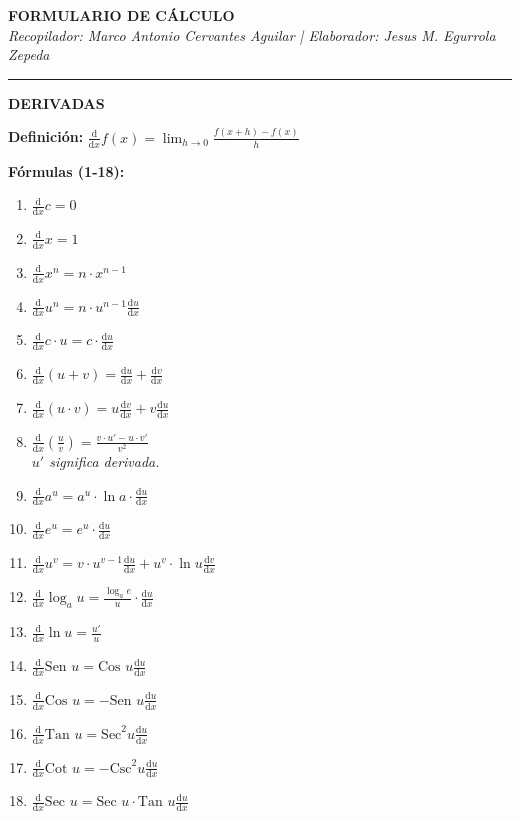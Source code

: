 \documentclass[10pt, letterpaper, landscape]{article}
\newcommand{\dd}{\mathrm{d}}
\newcommand{\deriv}[2]{\frac{\dd#1}{\dd#2}}
\begin{document}
\begin{center}
    {\large \textbf{FORMULARIO DE CÁLCULO}} \\
    \footnotesize \textit{Recopilador: Marco Antonio Cervantes Aguilar | Elaborador: Jesus M. Egurrola Zepeda}
\end{center}
\vspace{-0.3cm}
\hrule
\vspace{0.3cm}

\begin{minipage}[t]{8.3cm}
    \centerline{\textbf{\large DERIVADAS}}
    \vspace{0.1cm}

    \textbf{Definición:} $\deriv{}{x} f(x) = \lim_{h \to 0} \frac{f(x+h) - f(x)}{h}$

    \vspace{0.15cm}
    \textbf{Fórmulas (1-18):}
    \begin{enumerate}[label=\arabic*., nosep, itemsep=0pt, leftmargin=15pt]
        \item $\deriv{}{x} c = 0$
        \item $\deriv{}{x} x = 1$
        \item $\deriv{}{x} x^n = n \cdot x^{n-1}$
        \item $\deriv{}{x} u^n = n \cdot u^{n-1} \deriv{u}{x}$
        \item $\deriv{}{x} c \cdot u = c \cdot \deriv{u}{x}$
        \item $\deriv{}{x} (u+v) = \deriv{u}{x} + \deriv{v}{x}$
        \item $\deriv{}{x} (u \cdot v) = u \deriv{v}{x} + v \deriv{u}{x}$
        \item $\deriv{}{x} \left(\frac{u}{v}\right) = \frac{v \cdot u' - u \cdot v'}{v^2}$ \\ \textit{\scriptsize $u'$ significa derivada.}
        \item $\deriv{}{x} a^u = a^u \cdot \ln a \cdot \deriv{u}{x}$
        \item $\deriv{}{x} e^u = e^u \cdot \deriv{u}{x}$
        \item $\deriv{}{x} u^v = v \cdot u^{v-1} \deriv{u}{x} + u^v \cdot \ln u \deriv{v}{x}$
        \item $\deriv{}{x} \log_a u = \frac{\log_a e}{u} \cdot \deriv{u}{x}$
        \item $\deriv{}{x} \ln u = \frac{u'}{u}$
        \item $\deriv{}{x} \text{Sen } u = \text{Cos } u \deriv{u}{x}$
        \item $\deriv{}{x} \text{Cos } u = -\text{Sen } u \deriv{u}{x}$
        \item $\deriv{}{x} \text{Tan } u = \text{Sec}^2 u \deriv{u}{x}$
        \item $\deriv{}{x} \text{Cot } u = -\text{Csc}^2 u \deriv{u}{x}$
        \item $\deriv{}{x} \text{Sec } u = \text{Sec } u \cdot \text{Tan } u \deriv{u}{x}$
    \end{enumerate}
\end{minipage}%
\end{document}
